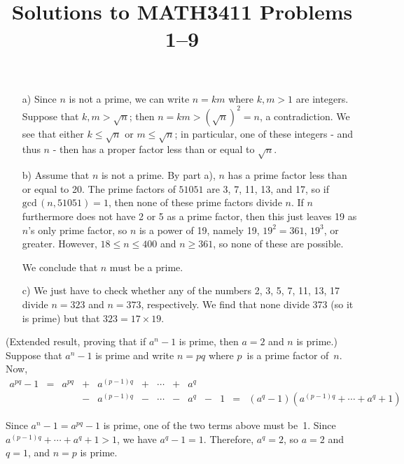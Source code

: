 \documentclass[11pt]{article}
\date{}
\author{}
\title{\sc Solutions to MATH3411 Problems 1--9}
\begin{document}
 \maketitle

\vspace*{-10mm}

\begin{itemize}
  \item[{a)}]
     Since $n$ is not a prime,
     we can write $n = km$ where $k,m>1$ are integers.
     Suppose that $k,m>\sqrt{n}$;
     then $n = km > (\sqrt{n})^2 = n$,
     a contradiction.
     We see that either $k\leq\sqrt{n}$ or $m\leq\sqrt{n}$;
     in particular, one of these integers - and thus $n$ -
     then has a proper factor less than or equal to $\sqrt{n}$.
  \item[{b)}]
     Assume that $n$ is not a prime.
     By part a), $n$ has a prime factor less than or equal to 20.
     The prime factors of $51051$ are 3, 7, 11, 13, and 17,
     so if $\text{gcd}\,(n,51051) = 1$,
     then none of these prime factors divide $n$.
     If $n$ furthermore does not have 2 or 5 as a prime factor,
     then this just leaves 19 as $n$'s only prime factor,
     so $n$ is a power of 19, namely 19, $19^2 = 361$, $19^3$, or greater.
     However, $18\leq n\leq 400$ and $n\geq 361$,
     so none of these are possible.

     We conclude that $n$ must be a prime.
  \item[{c)}]
     We just have to check whether any of the numbers 2, 3, 5, 7, 11, 13, 17
     divide $n=323$ and $n=373$, respectively.
     We find that none divide 373 (so it is prime) but that $323 = 17\times 19$.
\end{itemize}

 (Extended result, proving that if $a^n-1$ is prime, then $a=2$ and $n$ is prime.)\\
Suppose that $a^n-1$ is prime and write $n = pq$ where $p$~is a prime factor of~$n$.
Now,
\[
  \begin{array}{rccrrrrrrrrrr}
    a^{pq} - 1 &=& a^{pq}&+&a^{(p-1)q}&+&\cdots&+&a^{q}& &\\
               & &       &-&a^{(p-1)q}&-&\cdots&-&a^{q}&-&1&=&(a^q\!-\!1)(a^{(p-1)q}+\cdots+a^{q}+1)
  \end{array}
\]

Since $a^n-1=a^{pq}-1$ is prime,
one of the two terms above must be~1.
Since $a^{(p-1)q}+\cdots+a^{q}+1>1$,
we have $a^q-1=1$.
Therefore,
$a^q=2$,
so $a=2$ and $q=1$,
and $n=p$ is prime.
\end{document}
